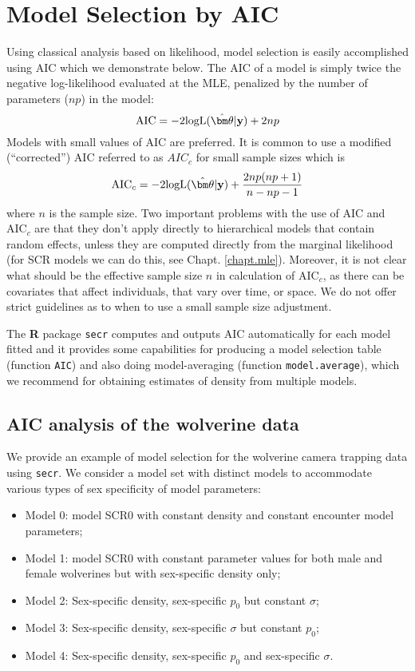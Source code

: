 \section{Model Selection by AIC}
\label{gof.sec.aic}

Using classical analysis based on likelihood, model selection
is easily accomplished using AIC \citep{burnham_anderson:2002}
which we demonstrate below. The AIC of a model is simply twice the
negative log-likelihood evaluated at the MLE, penalized by the number of parameters
($np$) in the model:
\[
 \mbox{AIC} = -2 \mbox{logL}(\hat{\bm \theta}|{\bf y})  + 2 np
\]
Models with small values of AIC are preferred.
It is common to use a modified (``corrected'') AIC referred to as $AIC_{c}$ for small
sample sizes which is
\[
 \mbox{AIC}_{c}  =
-2 \mbox{logL}(\hat{\bm \theta}|{\bf y})  + \frac{2 np
  (np+1)}{n-np-1}
\]
where $n$ is the sample size.  Two important problems with the use of
AIC and AIC$_{c}$ are that they don't apply directly to hierarchical
models that contain random effects, unless they are computed directly
from the marginal likelihood (for SCR models we can do this, see
Chapt. \ref{chapt.mle}). Moreover, it is not clear what should be the
effective sample size $n$ in calculation of AIC$_{c}$, as there can be
covariates that affect individuals, that vary over time, or space.
We do not offer strict guidelines as to when to use a small sample
size adjustment.

The {\bf R} package \mbox{\tt secr} computes and outputs AIC
automatically for each model fitted and it provides some capabilities
for producing a model selection table (function \mbox{\tt AIC}) and
also doing model-averaging (function \mbox{\tt model.average}), which
we recommend for obtaining estimates of density from multiple models.

\subsection{AIC analysis of the wolverine data}

We provide an example of model selection for the wolverine camera
trapping data using \mbox{\tt secr}.
 We consider a model set with  distinct models to accommodate
various types of sex specificity of model parameters:
\hspace{.5in} \begin{itemize}
\item[] Model 0: model SCR0 with constant density and constant
  encounter model parameters;

\item[] Model 1: model SCR0 with constant parameter
values for both male and female wolverines but with sex-specific
density only;

\item[] Model 2: Sex-specific density, sex-specific $p_{0}$ but constant $\sigma$;

\item[] Model 3: Sex-specific density, sex-specific $\sigma$ but constant
$p_{0}$;

\item[] Model 4: Sex-specific density, sex-specific $p_{0}$ and sex-specific $\sigma$.
\end{itemize}


